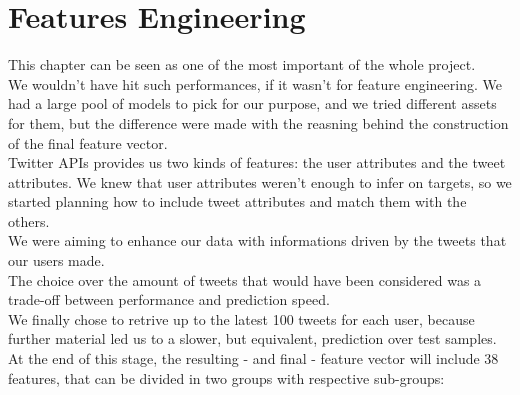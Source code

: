 \chapter{Features Engineering}
\label{capitolo4}
\thispagestyle{empty}

This chapter can be seen as one of the most important of the whole project.\\
We wouldn't have hit such performances, if it wasn't for feature engineering. We had a large pool of models to pick for our purpose,  and we tried different assets for them, but the difference were made with the reasning behind the construction of the final feature vector.\\
Twitter APIs provides us two kinds of features: the user attributes and the tweet attributes.
We knew that user attributes weren't enough to infer on targets, so we started planning how to include tweet attributes and match them with the others.\\
We were aiming to enhance our data with informations driven by the tweets that our users made.\\
The choice over the amount of tweets that would have been considered was a trade-off between performance and prediction speed.\\
We finally chose to retrive up to the latest 100 tweets for each user, because further material led us to a slower, but equivalent, prediction over test samples.\\
At the end of this stage, the resulting - and final - feature vector will include 38 features, that can be divided in two groups with respective sub-groups:
\small
